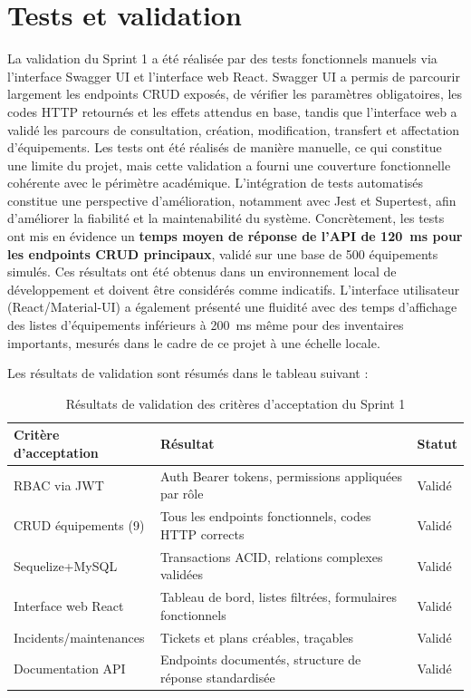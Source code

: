 \section{Tests et validation}
\label{sec:tests_validation_sprint1}

La validation du Sprint 1 a été réalisée par des tests fonctionnels manuels via l'interface Swagger UI et l'interface web React. Swagger UI a permis de parcourir largement les endpoints CRUD exposés, de vérifier les paramètres obligatoires, les codes HTTP retournés et les effets attendus en base, tandis que l'interface web a validé les parcours de consultation, création, modification, transfert et affectation d'équipements. Les tests ont été réalisés de manière manuelle, ce qui constitue une limite du projet, mais cette validation a fourni une couverture fonctionnelle cohérente avec le périmètre académique. L’intégration de tests automatisés constitue une perspective d’amélioration, notamment avec Jest et Supertest, afin d'améliorer la fiabilité et la maintenabilité du système. Concrètement, les tests ont mis en évidence un \textbf{temps moyen de réponse de l'API de 120~ms pour les endpoints CRUD principaux}, validé sur une base de 500 équipements simulés. Ces résultats ont été obtenus dans un environnement local de développement et doivent être considérés comme indicatifs. L'interface utilisateur (React/Material-UI) a également présenté une fluidité avec des temps d'affichage des listes d'équipements inférieurs à 200~ms même pour des inventaires importants, mesurés dans le cadre de ce projet à une échelle locale.

Les résultats de validation sont résumés dans le tableau suivant :

\begin{table}[H]
\centering
\caption{Résultats de validation des critères d'acceptation du Sprint 1}
\label{tab:resultats_validation_sprint1}
\begin{tabular}{|p{4cm}|p{7cm}|l|}
\hline
\textbf{Critère d'acceptation} & \textbf{Résultat} & \textbf{Statut} \\
\hline
RBAC via JWT & Auth Bearer tokens, permissions appliquées par rôle & Validé \\
\hline
CRUD équipements (9) & Tous les endpoints fonctionnels, codes HTTP corrects & Validé \\
\hline
Sequelize+MySQL & Transactions ACID, relations complexes validées & Validé \\
\hline
Interface web React & Tableau de bord, listes filtrées, formulaires fonctionnels & Validé \\
\hline
Incidents/maintenances & Tickets et plans créables, traçables & Validé \\
\hline
Documentation API & Endpoints documentés, structure de réponse standardisée & Validé \\
\hline
\end{tabular}
\end{table}


